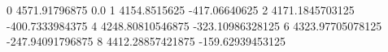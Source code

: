 0 4571.91796875 0.0
1 4154.8515625 -417.06640625
2 4171.1845703125 -400.7333984375
4 4248.80810546875 -323.10986328125
6 4323.97705078125 -247.94091796875
8 4412.28857421875 -159.62939453125

